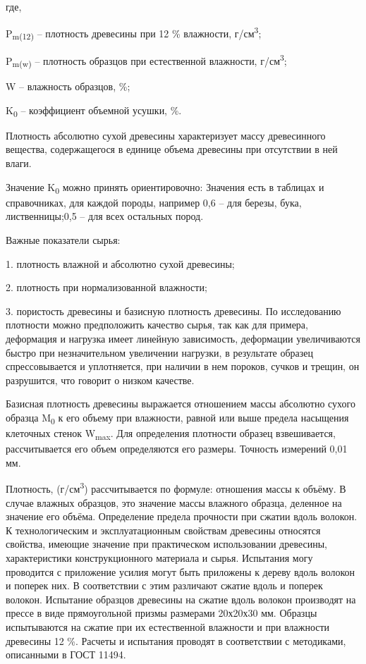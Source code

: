 \begin{multicols}{2}
где,

P\textsubscript{m(12)} -- плотность древесины при 12 \% влажности,
г/см\textsuperscript{3};

P\textsubscript{m(w)} -- плотность образцов при естественной влажности,
г/см\textsuperscript{3};

W -- влажность образцов, \%;

K\textsubscript{0} -- коэффициент объемной усушки, \%.

Плотность абсолютно сухой древесины характеризует массу древесинного
вещества, содержащегося в единице объема древесины при отсутствии в ней
влаги.

Значение K\textsubscript{0} можно принять ориентировочно: Значения есть
в таблицах и справочниках, для каждой породы, например 0,6 -- для
березы, бука, лиственницы;0,5 -- для всех остальных пород.

Важные показатели сырья:

1. плотность влажной и абсолютно сухой древесины;

2. плотность при нормализованной влажности;

3. пористость древесины и базисную плотность древесины.
По исследованию плотности можно предположить качество сырья, так как для
примера, деформация и нагрузка имеет линейную зависимость, деформации
увеличиваются быстро при незначительном увеличении нагрузки, в
результате образец спрессовывается и уплотняется, при наличии в нем
пороков, сучков и трещин, он разрушится, что говорит о низком качестве.

Базисная плотность древесины выражается отношением массы абсолютно
сухого образца M\textsubscript{0} к его объему при влажности, равной или
выше предела насыщения клеточных стенок W\textsubscript{max}. Для
определения плотности образец взвешивается, рассчитывается его объем
определяются его размеры. Точность измерений 0,01 мм.

Плотность, (г/см\textsuperscript{3}) рассчитывается по формуле:
отношения массы к объёму. В случае влажных образцов, это значение массы
влажного образца, деленное на значение его объёма. Определение предела
прочности при сжатии вдоль волокон. К технологическим и эксплуатационным
свойствам древесины относятся свойства, имеющие значение при
практическом использовании древесины, характеристики конструкционного
материала и сырья. Испытания могу проводится с приложение усилия могут
быть приложены к дереву вдоль волокон и поперек них. В соответствии с
этим различают сжатие вдоль и поперек волокон. Испытание образцов
древесины на сжатие вдоль волокон производят на прессе в виде
прямоугольной призмы размерами 20х20х30 мм. Образцы испытываются на
сжатие при их естественной влажности и при влажности древесины 12 \%.
Расчеты и испытания проводят в соответствии с методиками, описанными в
ГОСТ 11494.


\end{multicols}
